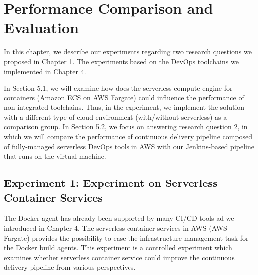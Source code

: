 \chapter{Performance Comparison and Evaluation}
In this chapter, we describe our experiments regarding two research questions we proposed in Chapter 1. The experiments based on the DevOps toolchains we implemented in Chapter 4.
\par
In Section 5.1, we will examine how does the serverless compute engine for containers (Amazon ECS on AWS Fargate) could influence the performance of non-integrated toolchains. Thus, in the experiment, we implement the solution with a different type of cloud environment (with/without serverless) as a comparison group.
In Section 5.2, we focus on answering research question 2, in which we will compare the performance of continuous delivery pipeline composed of fully-managed serverless DevOps tools in AWS with our Jenkins-based pipeline that runs on the virtual machine.
\section{Experiment 1: Experiment on Serverless Container Services}
The Docker agent has already been supported by many CI/CD tools ad we introduced in Chapter 4.
The serverless container services in AWS (AWS Fargate) provides the possibility to ease the infrastructure management task for the Docker build agents.
This experiment is a controlled experiment which examines whether serverless container service could improve the continuous delivery pipeline from various perspectives.
